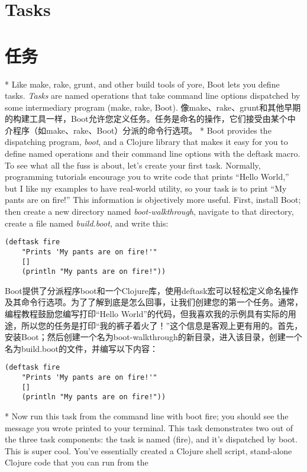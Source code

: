 \begin{paracol}{2}
\section{Tasks}
\switchcolumn
\section{任务}
\switchcolumn[0]*
Like make, rake, grunt, and other build tools of yore, Boot lets you
define tasks. \emph{Tasks} are named operations that take command line
options dispatched by some intermediary program (make, rake, Boot).
\switchcolumn
像make、rake、grunt和其他早期的构建工具一样，Boot允许您定义任务。任务是命名的操作，它们接受由某个中介程序（如make、rake、Boot）分派的命令行选项。
\switchcolumn[0]*
Boot provides the dispatching program, \emph{boot}, and a Clojure
library that makes it easy for you to define named operations and their
command line options with the deftask macro. To see what all the fuss is
about, let's create your first task. Normally, programming tutorials
encourage you to write code that prints ``Hello World,'' but I like my
examples to have real-world utility, so your task is to print ``My pants
are on fire!'' This information is objectively more useful. First,
install Boot; then create a new directory named \emph{boot-walkthrough},
navigate to that directory, create a file named \emph{build.boot,} and
write this:
\begin{verbatim}
(deftask fire
    "Prints 'My pants are on fire!'"
    []
    (println "My pants are on fire!"))
\end{verbatim}
\switchcolumn
Boot提供了分派程序boot和一个Clojure库，使用deftask宏可以轻松定义命名操作及其命令行选项。为了了解到底是怎么回事，让我们创建您的第一个任务。通常，编程教程鼓励您编写打印“Hello World”的代码，但我喜欢我的示例具有实际的用途，所以您的任务是打印“我的裤子着火了！”这个信息是客观上更有用的。首先，安装Boot；然后创建一个名为boot-walkthrough的新目录，进入该目录，创建一个名为build.boot的文件，并编写以下内容：
\begin{verbatim}
(deftask fire
    "Prints 'My pants are on fire!'"
    []
    (println "My pants are on fire!"))
\end{verbatim}
\switchcolumn[0]*
Now run this task from the command line with boot fire; you should see
the message you wrote printed to your terminal. This task demonstrates
two out of the three task components: the task is named (fire), and it's
dispatched by boot. This is super cool. You've essentially created a
Clojure shell script, stand-alone Clojure code that you can run from the

\end{paracol}
